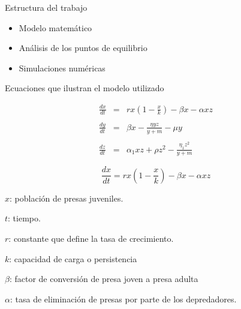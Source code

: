 \documentclass{beamer}
\begin{document}
\begin{frame}{Estructura del trabajo}
    \begin{itemize}
        \item Modelo matemático
        \item Análisis de los puntos de equilibrio
        \item Simulaciones numéricas
    \end{itemize}
\end{frame}
\begin{frame}{Ecuaciones que ilustran el modelo utilizado}

    \begin{eqnarray*}
        \frac{dx}{dt} &=& rx(1-\frac{x}{k})-\beta x-\alpha xz\\
        \\
        \frac{dy}{dt} &=& \beta x-\frac{\eta yz}{y+m}-\mu y\\
        \\
        \frac{dz}{dt} &=& \alpha_1 xz+\rho z^2-\frac{\eta_1z^2}{y+m}
    \end{eqnarray*}
\end{frame}

\begin{frame}

    {\bf $$\frac{dx}{dt} = rx(1-\frac{x}{k})-\beta x-\alpha xz$$ }


    $x$: población de presas juveniles.

    $t$: tiempo.

    $r$: constante que define la tasa de crecimiento.

    $k$: capacidad de carga o persistencia


    $\beta$: factor de conversión de presa joven a presa adulta

    $\alpha$: tasa de eliminación de presas por parte de los depredadores.

\end{frame}
\end{document}
